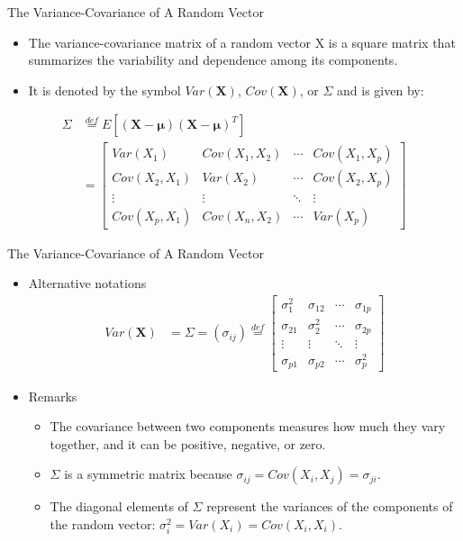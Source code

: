 \documentclass[
  ignorenonframetext,
]{beamer}
\providecommand{\tightlist}{%
  \setlength{\itemsep}{0pt}\setlength{\parskip}{0pt}}
\begin{document}
\begin{frame}{The Variance-Covariance of A Random Vector}
\protect\hypertarget{the-variance-covariance-of-a-random-vector}{}
\begin{itemize}
\tightlist
\item
  The variance-covariance matrix of a random vector X is a square matrix
  that summarizes the variability and dependence among its components.
\item
  It is denoted by the symbol \(Var(\mathbf X)\), \(Cov(\mathbf X)\), or
  \(\Sigma\) and is given by:
\end{itemize}

\[\begin{aligned}
\Sigma &\overset{def} = E[(\mathbf X - \boldsymbol \mu)(\mathbf X - \boldsymbol \mu)^T]\\
&=
\begin{bmatrix} 
Var(X_1) & Cov(X_1, X_2) & \cdots & Cov(X_1, X_p) \\ 
Cov(X_2, X_1) & Var(X_2) & \cdots & Cov(X_2, X_p) \\
\vdots & \vdots & \ddots & \vdots \\ 
Cov(X_p, X_1) & Cov(X_n, X_2) & \cdots & Var(X_p) 
\end{bmatrix}
\end{aligned}\]
\end{frame}

\begin{frame}{The Variance-Covariance of A Random Vector}
\protect\hypertarget{the-variance-covariance-of-a-random-vector-1}{}
\begin{itemize}
\item
  Alternative notations \[\begin{aligned}
  Var(\mathbf{X}) &= \Sigma = \left(\sigma_{ij}\right)  \overset{def}= 
  \begin{bmatrix} 
  \sigma_1^2 & \sigma_{12} & \cdots & \sigma_{1p} \\ 
  \sigma_{21} & \sigma_2^2 & \cdots & \sigma_{2p} \\
  \vdots & \vdots & \ddots & \vdots \\ 
  \sigma_{p1} & \sigma_{p2} & \cdots & \sigma_p^2 
  \end{bmatrix}
  \end{aligned}\]
\item
  Remarks

  \begin{itemize}
  \tightlist
  \item
    The covariance between two components measures how much they vary
    together, and it can be positive, negative, or zero.
  \item
    \(\Sigma\) is a symmetric matrix because
    \(\sigma_{ij}=Cov(X_i, X_j)=\sigma_{ji}\).
  \item
    The diagonal elements of \(\Sigma\) represent the variances of the
    components of the random vector:
    \(\sigma_i^2=Var(X_i)=Cov(X_i, X_i)\).
  \end{itemize}
\end{itemize}
\end{frame}
\end{document}
